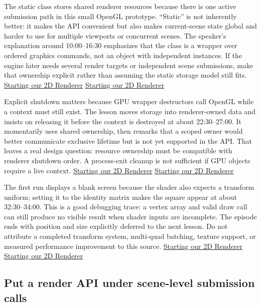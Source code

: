The static class stores shared renderer resources because there is one active submission path in this small OpenGL prototype. ``Static'' is not inherently better: it makes the API convenient but also makes current-scene state global and harder to use for multiple viewports or concurrent scenes. The speaker's explanation around 10:00--16:30 emphasizes that the class is a wrapper over ordered graphics commands, not an object with independent instances. If the engine later needs several render targets or independent scene submissions, make that ownership explicit rather than assuming the static storage model still fits. \href{https://www.youtube.com/watch?v=r_5fF1AxgpU&t=600s}{Starting our 2D Renderer} \href{https://www.youtube.com/watch?v=r_5fF1AxgpU&t=840s}{Starting our 2D Renderer}

Explicit shutdown matters because GPU wrapper destructors call OpenGL while a context must still exist. The lesson moves storage into renderer-owned data and insists on releasing it before the context is destroyed at about 22:30--27:00. It momentarily uses shared ownership, then remarks that a scoped owner would better communicate exclusive lifetime but is not yet supported in the API. That leaves a real design question: resource ownership must be compatible with renderer shutdown order. A process-exit cleanup is not sufficient if GPU objects require a live context. \href{https://www.youtube.com/watch?v=r_5fF1AxgpU&t=1350s}{Starting our 2D Renderer} \href{https://www.youtube.com/watch?v=r_5fF1AxgpU&t=1500s}{Starting our 2D Renderer}

The first run displays a blank screen because the shader also expects a transform uniform; setting it to the identity matrix makes the square appear at about 32:30--34:00. This is a good debugging trace: a vertex array and valid draw call can still produce no visible result when shader inputs are incomplete. The episode ends with position and size explicitly deferred to the next lesson. Do not attribute a completed transform system, multi-quad batching, texture support, or measured performance improvement to this source. \href{https://www.youtube.com/watch?v=r_5fF1AxgpU&t=1950s}{Starting our 2D Renderer} \href{https://www.youtube.com/watch?v=r_5fF1AxgpU&t=2040s}{Starting our 2D Renderer}

\subsection{Put a render API under scene-level submission calls}\label{06-engine-ii-ch025-put-a-render-api-under-scene-level-submission-calls}

